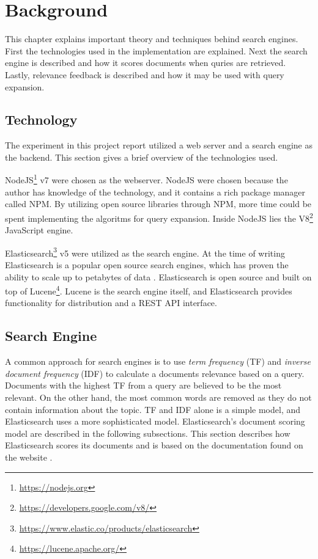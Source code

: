 \chapter{Background}
\label{ch:background}
This chapter explains important theory and techniques behind search engines.
First the technologies used in the implementation are explained.
Next the search engine is described and how it scores documents when quries are retrieved.
Lastly, relevance feedback is described and how it may be used with query expansion.

\section{Technology}
The experiment in this project report utilized a web server and a search engine as the backend.
This section gives a brief overview of the technologies used.

NodeJS\footnote{\url{https://nodejs.org}} v7 were chosen as the webserver.
NodeJS were chosen because the author has knowledge of the technology,
and it contains a rich package manager called NPM.
By utilizing open source libraries through NPM, more time could be spent implementing the algoritms for query expansion.
Inside NodeJS lies the V8\footnote{\url{https://developers.google.com/v8/}} JavaScript engine.

Elasticsearch\footnote{\url{https://www.elastic.co/products/elasticsearch}} v5 were utilized as the search engine.
At the time of writing Elasticsearch is a popular open source search engines, which has proven the ability to scale up to petabytes of data \cite{elasticsearch-scale}.
Elasticsearch is open source and built on top of Lucene\footnote{\url{https://lucene.apache.org/}}.
Lucene is the search engine itself,
and Elasticsearch provides functionality for distribution and a REST API interface.

\section{Search Engine}
A common approach for search engines is to use \textit{term frequency} (TF) and \textit{inverse document frequency} (IDF) to calculate a documents relevance based on a query.
Documents with the highest TF from a query are believed to be the most relevant.
On the other hand, the most common words are removed as they do not contain information about the topic.
TF and IDF alone is a simple model, and Elasticsearch uses a more sophisticated model.
Elasticsearch's document scoring model are described in the following subsections.
This section describes how Elasticsearch scores its documents and is based on the documentation found on the website \cite{elasticsearch-scoring}.

